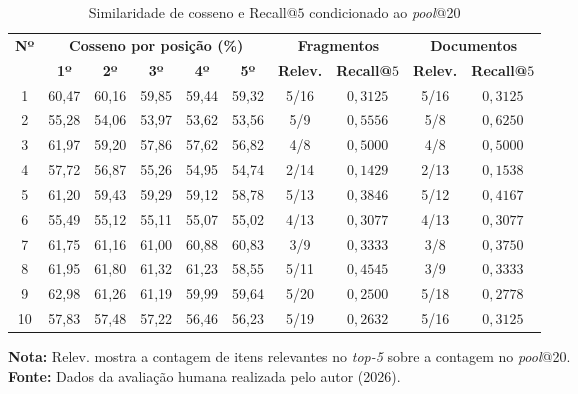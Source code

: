 \begin{table}[!htbp]
\centering
\caption{Similaridade de cosseno e Recall@$5$ condicionado ao \textit{pool}@20}
\label{tab:resultados-experimento-tematico}
\setlength{\tabcolsep}{4pt}
\renewcommand{\arraystretch}{1.18}
\footnotesize
\begin{tabular*}{\textwidth}{@{\extracolsep{\fill}}c*{5}{c}cccc}
\toprule
\textbf{Nº} & \multicolumn{5}{c}{\textbf{Cosseno por posição (\%)}} & \multicolumn{2}{c}{\textbf{Fragmentos}} & \multicolumn{2}{c}{\textbf{Documentos}} \\
& \textbf{1º} & \textbf{2º} & \textbf{3º} & \textbf{4º} & \textbf{5º} & \textbf{Relev.} & \textbf{Recall@$5$} & \textbf{Relev.} & \textbf{Recall@$5$} \\ \midrule
1 & 60,47 & 60,16 & 59,85 & 59,44 & 59,32 & 5/16 & $0{,}3125$ & 5/16 & $0{,}3125$ \\
2 & 55,28 & 54,06 & 53,97 & 53,62 & 53,56 & 5/9 & $0{,}5556$ & 5/8 & $0{,}6250$ \\
3 & 61,97 & 59,20 & 57,86 & 57,62 & 56,82 & 4/8 & $0{,}5000$ & 4/8 & $0{,}5000$ \\
4 & 57,72 & 56,87 & 55,26 & 54,95 & 54,74 & 2/14 & $0{,}1429$ & 2/13 & $0{,}1538$ \\
5 & 61,20 & 59,43 & 59,29 & 59,12 & 58,78 & 5/13 & $0{,}3846$ & 5/12 & $0{,}4167$ \\
6 & 55,49 & 55,12 & 55,11 & 55,07 & 55,02 & 4/13 & $0{,}3077$ & 4/13 & $0{,}3077$ \\
7 & 61,75 & 61,16 & 61,00 & 60,88 & 60,83 & 3/9 & $0{,}3333$ & 3/8 & $0{,}3750$ \\
8 & 61,95 & 61,80 & 61,32 & 61,23 & 58,55 & 5/11 & $0{,}4545$ & 3/9 & $0{,}3333$ \\
9 & 62,98 & 61,26 & 61,19 & 59,99 & 59,64 & 5/20 & $0{,}2500$ & 5/18 & $0{,}2778$ \\
10 & 57,83 & 57,48 & 57,22 & 56,46 & 56,23 & 5/19 & $0{,}2632$ & 5/16 & $0{,}3125$ \\ \bottomrule
\end{tabular*}
\par\smallskip
\begin{minipage}{\textwidth}
\footnotesize\textbf{Nota:} Relev. mostra a contagem de itens relevantes no \textit{top-5} sobre a contagem no \textit{pool}@20.\\
\textbf{Fonte:} Dados da avaliação humana realizada pelo autor (2026).
\end{minipage}
\end{table}


